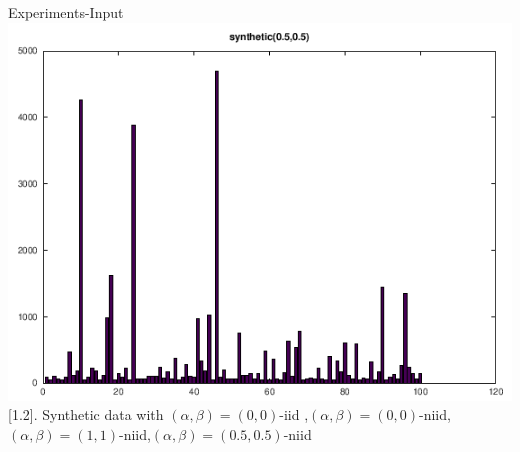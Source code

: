 \documentclass{beamer}
\begin{document}
\begin{frame}{Experiments-Input}
	\includegraphics[scale=0.2]{sy0.50.5.png}\\
	\figurename[1.2]{. Synthetic data with $(\alpha, \beta) =(0,0)$-iid ,$(\alpha, \beta) =(0,0)$-niid,$(\alpha, \beta) =(1,1)$-niid,$(\alpha, \beta) =(0.5,0.5)$-niid }\\
\end{frame}
\end{document}
